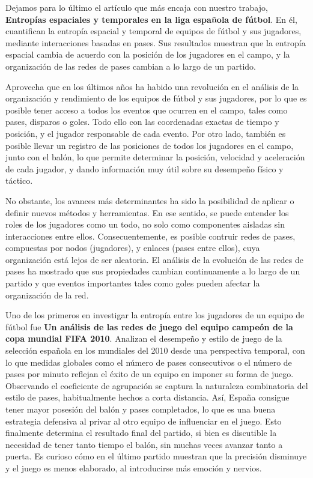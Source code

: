 Dejamos para lo último el artículo que más encaja con nuestro trabajo,
\textbf{Entropías espaciales y temporales en la liga española de fútbol}\cite{spatial-and-temporal-entropies}. 
En él, cuantifican la entropía espacial y temporal de equipos de fútbol y sus jugadores, 
mediante interacciones basadas en pases. Sus resultados muestran que la entropía 
espacial cambia de acuerdo con la posición de los jugadores en el campo, y la 
organización de las redes de pases cambian a lo largo de un partido. 

Aprovecha que en los últimos años ha habido una revolución en el análisis de la organización 
y rendimiento de los equipos de fútbol y sus jugadores, por lo que es posible tener acceso a todos los 
eventos que ocurren en el campo, tales como pases, disparos o goles.
Todo ello con las coordenadas exactas de tiempo y posición, y el jugador responsable de cada 
evento. Por otro lado, también es posible llevar un registro de las posiciones de todos los 
jugadores en el campo, junto con el balón, lo que 
permite determinar la posición, velocidad y aceleración de cada jugador, y dando información 
muy útil sobre su desempeño físico y táctico.

No obstante, los avances más determinantes ha sido la posibilidad de aplicar o definir nuevos métodos 
y herramientas. En ese sentido, se puede 
entender los roles de los jugadores como un todo, no solo como componentes aisladas sin 
interacciones entre ellos. Consecuentemente, es posible contruir redes de pases, compuestas 
por nodos (jugadores), y enlaces (pases entre ellos), cuya organización está lejos de ser 
aleatoria. El análisis de la evolución de las redes de pases ha mostrado que sus propiedades 
cambian continuamente a lo largo de un partido y que eventos importantes tales como goles 
pueden afectar la organización de la red.

Uno de los primeros en investigar la entropía entre los jugadores de un equipo de 
fútbol fue \textbf{Un análisis de las redes de juego del equipo campeón de la copa 
mundial FIFA 2010}\cite{network-analysis}. Analizan el desempeño y estilo de juego de la selección española en los mundiales del 2010 desde una 
perspectiva temporal, con lo que medidas globales como el número de pases consecutivos o el número de 
pases por minuto reflejan el éxito de un equipo en imponer su forma de juego. Observando el coeficiente 
de agrupación se captura la naturaleza combinatoria del estilo de pases, habitualmente hechos a corta distancia.
Así, España consigue tener mayor posesión del balón y pases completados, lo que es una buena estrategia defensiva 
al privar al otro equipo de influenciar en el juego. Esto finalmente determina el resultado final del partido, 
si bien es discutible la necesidad de tener tanto tiempo el balón, sin muchas veces avanzar tanto a puerta. Es 
curioso cómo en el último partido muestran que la precisión disminuye y el juego es menos elaborado, al introducirse 
más emoción y nervios.

